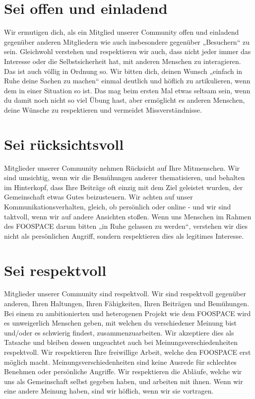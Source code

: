 \documentclass[10pt,a4paper]{article}
\begin{document}
\section{Sei offen und einladend}
Wir ermutigen dich, als ein Mitglied unserer Community offen und einladend
gegenüber anderen Mitgliedern wie auch insbesondere gegenüber „Besuchern“ zu
sein. Gleichwohl verstehen und respektieren wir auch, dass nicht jeder immer
das Interesse oder die Selbstsicherheit hat, mit anderen Menschen zu
interagieren. Das ist auch völlig in Ordnung so. Wir bitten dich, deinen Wunsch
„einfach in Ruhe deine Sachen zu machen“ einmal deutlich und höflich zu
artikulieren, wenn dem in einer Situation so ist. Das mag beim ersten Mal etwas
seltsam sein, wenn du damit noch nicht so viel Übung hast, aber ermöglicht es
anderen Menschen, deine Wünsche zu respektieren und vermeidet Missverständnisse.

\section{Sei rücksichtsvoll}
Mitglieder unserer Community nehmen Rücksicht auf Ihre Mitmenschen. Wir sind
umsichtig, wenn wir die Bemühungen anderer thematisieren, und behalten im
Hinterkopf, dass Ihre Beiträge oft einzig mit dem Ziel geleistet wurden, der Gemeinschaft etwas Gutes
beizusteuern. Wir achten auf unser Kommunikationsverhalten,
gleich, ob persönlich oder online - und wir sind taktvoll, wenn wir auf andere
Ansichten stoßen. Wenn uns Menschen im Rahmen des FOOSPACE darum bitten „in Ruhe
gelassen zu werden“, verstehen wir dies nicht als persönlichen Angriff, sondern
respektieren dies als legitimes Interesse.

\section{Sei respektvoll}
Mitglieder unserer Community sind respektvoll. Wir sind respektvoll gegenüber
anderen, Ihren Haltungen, Ihren Fähigkeiten, Ihren Beiträgen und Bemühungen.
Bei einem zu ambitionierten und heterogenen Projekt wie dem FOOSPACE wird es
unweigerlich Menschen geben, mit welchen du verschiedener Meinung bist und/oder
es schwierig findest, zusammenzuarbeiten. Wir akzeptiere dies als Tatsache und
bleiben dessen ungeachtet auch bei Meinungsverschiedenheiten respektvoll. Wir
respektieren Ihre freiwillige Arbeit, welche den FOOSPACE erst möglich macht.
Meinungsverschiedenheiten sind keine Ausrede für schlechtes Benehmen oder
persönliche Angriffe. Wir respektieren die Abläufe, welche wir uns als
Gemeinschaft selbst gegeben haben, und arbeiten mit ihnen. Wenn wir eine andere
Meinung haben, sind wir höflich, wenn wir sie vortragen.
\end{document}
